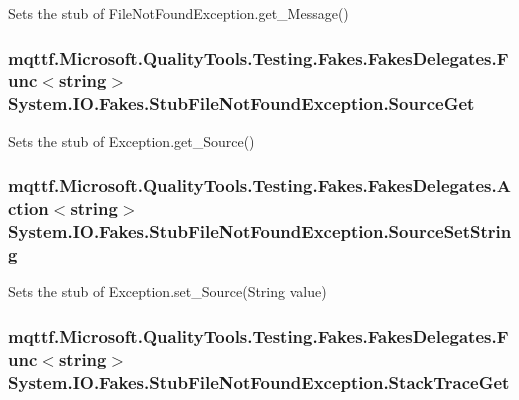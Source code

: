 Sets the stub of File\-Not\-Found\-Exception.\-get\-\_\-\-Message()

\hypertarget{class_system_1_1_i_o_1_1_fakes_1_1_stub_file_not_found_exception_a94e2b40d37a5eb13ba28ea567850a47d}{
\subsubsection[{Source\-Get}]{\setlength{\rightskip}{0pt plus 5cm}mqttf.\-Microsoft.\-Quality\-Tools.\-Testing.\-Fakes.\-Fakes\-Delegates.\-Func$<$string$>$ System.\-I\-O.\-Fakes.\-Stub\-File\-Not\-Found\-Exception.\-Source\-Get}}\label{class_system_1_1_i_o_1_1_fakes_1_1_stub_file_not_found_exception_a94e2b40d37a5eb13ba28ea567850a47d}


Sets the stub of Exception.\-get\-\_\-\-Source()

\hypertarget{class_system_1_1_i_o_1_1_fakes_1_1_stub_file_not_found_exception_abf31f6c660b70bcbbc8bcd4d65ed31c4}{
\subsubsection[{Source\-Set\-String}]{\setlength{\rightskip}{0pt plus 5cm}mqttf.\-Microsoft.\-Quality\-Tools.\-Testing.\-Fakes.\-Fakes\-Delegates.\-Action$<$string$>$ System.\-I\-O.\-Fakes.\-Stub\-File\-Not\-Found\-Exception.\-Source\-Set\-String}}\label{class_system_1_1_i_o_1_1_fakes_1_1_stub_file_not_found_exception_abf31f6c660b70bcbbc8bcd4d65ed31c4}


Sets the stub of Exception.\-set\-\_\-\-Source(\-String value)

\hypertarget{class_system_1_1_i_o_1_1_fakes_1_1_stub_file_not_found_exception_af4225e6f924523e22a0ddc3f554a69cb}{
\subsubsection[{Stack\-Trace\-Get}]{\setlength{\rightskip}{0pt plus 5cm}mqttf.\-Microsoft.\-Quality\-Tools.\-Testing.\-Fakes.\-Fakes\-Delegates.\-Func$<$string$>$ System.\-I\-O.\-Fakes.\-Stub\-File\-Not\-Found\-Exception.\-Stack\-Trace\-Get}}\label{class_system_1_1_i_o_1_1_fakes_1_1_stub_file_not_found_exception_af4225e6f924523e22a0ddc3f554a69cb}


